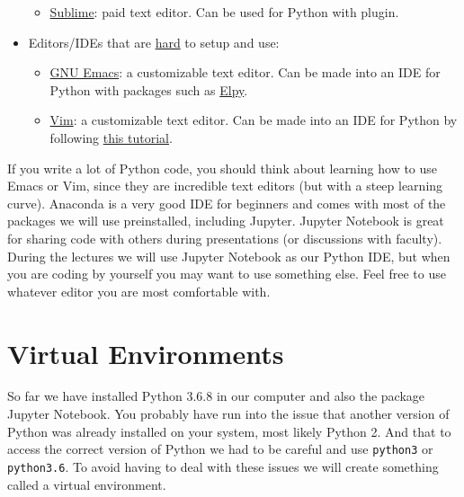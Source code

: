 \documentclass[12pt, a4paper]{article}
\begin{document}
\begin{itemize}
\begin{itemize}
\item \href{https://www.sublimetext.com}{Sublime}: paid text editor. Can be used for Python with plugin.
\end{itemize}
\item Editors/IDEs that are \uline{hard} to setup and use:
\begin{itemize}
\item \href{https://www.gnu.org/software/emacs/}{GNU Emacs}: a customizable text editor. Can be made into an IDE for Python with packages such as \href{https://github.com/jorgenschaefer/elpy\#elpy-the-emacs-lisp-python-environment}{Elpy}.
\item \href{https://www.vim.org}{Vim}: a customizable text editor. Can be made into an IDE for Python by following \href{https://realpython.com/vim-and-python-a-match-made-in-heaven/}{this tutorial}.
\end{itemize}
\end{itemize}

If you write a lot of Python code, you should think about learning how to use Emacs or Vim, since they are incredible text editors (but with a steep learning curve). Anaconda is a very good IDE for beginners and comes with most of the packages we will use preinstalled, including Jupyter.
Jupyter Notebook is great for sharing code with others during presentations (or discussions with faculty).
During the lectures we will use Jupyter Notebook as our Python IDE, but when you are coding by yourself you may want to use something else.
Feel free to use whatever editor you are most comfortable with.
\section*{Virtual Environments}
\label{sec:orgfc1cc95}
So far we have installed Python 3.6.8 in our computer and also the package Jupyter Notebook.
You probably have run into the issue that another version of Python was already installed on your system, most likely Python 2.
And that to access the correct version of Python we had to be careful and use \texttt{python3} or \texttt{python3.6}.
To avoid having to deal with these issues we will create something called a virtual environment.
\end{document}
